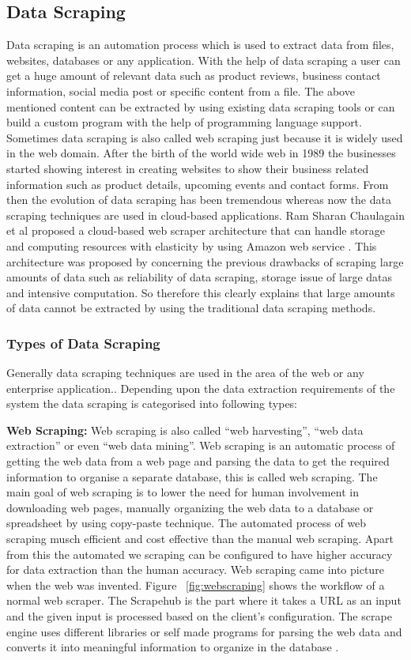 \subsection{Data Scraping}
Data scraping is an automation process which is used to extract data from files, websites, databases or any application. With the help of data scraping a user can get a huge amount of relevant data such as product reviews, business contact information, social media post or specific content from a file. The above mentioned content can be extracted by using existing data scraping tools or can build a custom program with the help of programming language support. Sometimes data scraping is also called web scraping just because it is widely used in the web domain. After the birth of the world wide web in 1989 the businesses started showing interest in creating websites to show their business related information such as product details, upcoming events and contact forms. From then the evolution of data scraping has been tremendous whereas now the data scraping techniques are used in cloud-based applications. Ram Sharan Chaulagain et al proposed a cloud-based web scraper architecture that can handle storage and computing resources with elasticity by using Amazon web service \cite{SaBa2016}. This architecture was proposed by concerning the previous drawbacks of scraping large amounts of data such as reliability of data scraping, storage issue of large datas and intensive computation. So therefore this clearly explains that large amounts of data cannot be extracted by using the traditional data scraping methods.

\subsubsection{Types of Data Scraping}
Generally data scraping techniques are used in the area of the web or any enterprise application.. Depending upon the data extraction requirements of the system the data scraping is categorised into following types: 

{\bf Web Scraping:} Web scraping is also called “web harvesting”, “web data extraction” or even “web data mining”. Web scraping is an automatic process of getting the web data from a web page and parsing the data  to get the required information to organise a separate database, this is called web scraping. The main goal of web scraping is to lower the need for human involvement in downloading web pages, manually organizing the web data to a database or spreadsheet by using copy-paste technique. The automated process of web scraping musch efficient and cost effective than the manual web scraping. Apart from this the automated we scraping can be configured to have higher accuracy for data extraction than the human accuracy. Web scraping came into picture when the web was invented. Figure  ~\ref{fig:webscraping} shows the workflow of a normal web scraper. The Scrapehub is the part where it takes a URL as an input and the given input is processed based on the client’s configuration. The scrape engine uses different libraries or self made programs for parsing the web data and converts it into meaningful information to organize in the database \cite{SaBa2016}.

